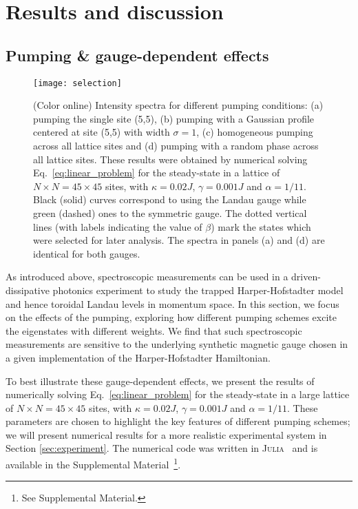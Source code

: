 \documentclass[twocolumn, 10pt, aps, superscriptaddress, floatfix, showpacs, pra, citeautoscript]{revtex4-1}
\begin{document}
\section{Results and discussion}
\label{sec:results}

\subsection{Pumping \& gauge-dependent effects}
\label{sec:selection}

\begin{figure}[tb]\centering
  \texttt{[image: selection]} %
  \caption{(Color online) Intensity spectra for different pumping conditions: (a)
    pumping the single site (5,5), (b) pumping with a Gaussian
    profile centered at site (5,5) with width $\sigma=1$, (c) homogeneous pumping across all lattice sites and (d) pumping with a random
    phase across all lattice sites. These results were obtained by numerical solving Eq.~\eqref{eq:linear_problem} for the steady-state in a lattice of
$N \times N = 45 \times 45$ sites, with $\kappa = 0.02 J$,
$\gamma = 0.001 J$ and $\alpha = 1/11$.   
    Black (solid) curves correspond to using the Landau gauge while
    green (dashed) ones to the symmetric gauge. The dotted vertical
    lines (with labels indicating the value of $\beta$) mark the
    states which were selected for later analysis. The spectra in
    panels (a) and (d) are identical for both gauges.}
  \label{fig:pumping_schemes}
\end{figure}

As introduced above, spectroscopic measurements can be used in a driven-dissipative photonics experiment to study the trapped Harper-Hofstadter model and hence toroidal Landau levels in momentum space. In this section, we focus on the effects of the pumping, exploring how different pumping schemes excite the eigenstates with different weights. We find that such spectroscopic measurements are sensitive to the underlying synthetic magnetic gauge chosen in a given implementation of the Harper-Hofstadter Hamiltonian. 

To best illustrate these gauge-dependent effects, we present the results of numerically solving
Eq.~\eqref{eq:linear_problem} for the steady-state in a large lattice of
$N \times N = 45 \times 45$ sites, with $\kappa = 0.02 J$,
$\gamma = 0.001 J$ and $\alpha = 1/11$.  These parameters are chosen to highlight the key features of different pumping schemes; we will present numerical results for a more realistic experimental system in Section \ref{sec:experiment}.  The numerical code was written
in \textsc{Julia}~\cite{bezanson2014julia} and is available in the Supplemental Material~\footnote{See Supplemental Material.}. 
\end{document}
